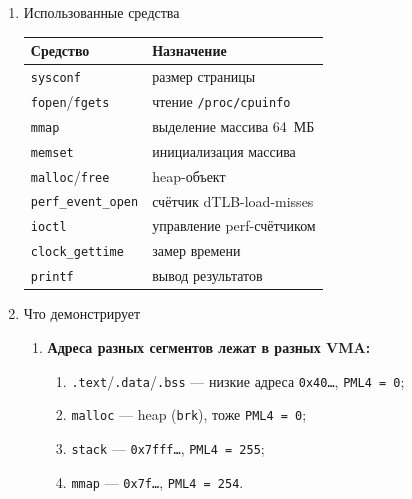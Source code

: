 \begin{enumerate}
\begin{enumerate}
    \item \textbf{Выполняет обход массива 64~МБ} с шагами 64~Б, 4~КБ,
    16~КБ и 64~КБ. Для каждого шага измеряет:
    \begin{enumerate}
        \item время обхода;
        \item количество реально прочитанных байт;
        \item скорость чтения;
        \item количество промахов \texttt{dTLB-load-misses} через
        \texttt{perf\_event\_open};
        \item долю промахов от числа обращений (miss rate).
    \end{enumerate}
    
    \item \textbf{Сравнивает} полученные значения dTLB-misses между
    всеми шагами и вычисляет отношение 64~Б / 64~КБ.
\end{enumerate}

\item Использованные средства

\begin{center}
\begin{tabular}{ll}
\toprule
\textbf{Средство} & \textbf{Назначение} \\
\midrule
\texttt{sysconf} & размер страницы \\
\texttt{fopen}/\texttt{fgets} & чтение \texttt{/proc/cpuinfo} \\
\texttt{mmap} & выделение массива 64~МБ \\
\texttt{memset} & инициализация массива \\
\texttt{malloc}/\texttt{free} & heap-объект \\
\texttt{perf\_event\_open} & счётчик dTLB-load-misses \\
\texttt{ioctl} & управление perf-счётчиком \\
\texttt{clock\_gettime} & замер времени \\
\texttt{printf} & вывод результатов \\
\bottomrule
\end{tabular}
\end{center}

\item Что демонстрирует

\begin{enumerate}
    \item \textbf{Адреса разных сегментов лежат в разных VMA:}
    \begin{enumerate}
        \item \texttt{.text}/\texttt{.data}/\texttt{.bss} — низкие адреса
        \texttt{0x40\ldots}, \texttt{PML4 = 0};
        \item \texttt{malloc} — heap (\texttt{brk}), тоже \texttt{PML4 = 0};
        \item \texttt{stack} — \texttt{0x7fff\ldots}, \texttt{PML4 = 255};
        \item \texttt{mmap} — \texttt{0x7f\ldots}, \texttt{PML4 = 254}.
    \end{enumerate}
    

\end{enumerate}
\end{enumerate}
